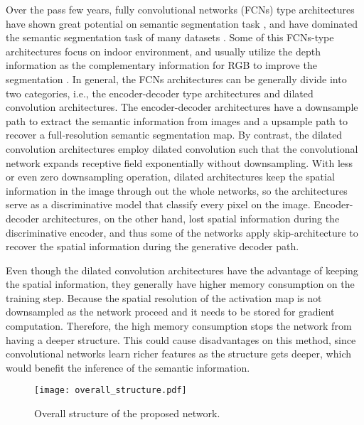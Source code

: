 \documentclass[runningheads]{llncs}
\begin{document}
Over the pass few years, fully convolutional networks (FCNs) type architectures have shown great potential on semantic segmentation task \cite{long2015fully,noh2015learning,badrinarayanan2015segnet,chen2016deeplab,yu2015multi,lin2017refinenet,yu2017dilated}, and have dominated the semantic segmentation task of many datasets \cite{everingham2010pascal,cordts2016cityscapes,song2015sun}. Some of this FCNs-type architectures focus on indoor environment, and usually utilize the depth information as the complementary information for RGB to improve the segmentation \cite{long2015fully,couprie2013indoor,gupta2014learning,hazirbas2016fusenet}. In general, the FCNs architectures can be generally divide into two categories, i.e., the encoder-decoder type architectures and dilated convolution architectures. The encoder-decoder architectures \cite{long2015fully,noh2015learning,badrinarayanan2015segnet,lin2017refinenet,hazirbas2016fusenet} have a downsample path to extract the semantic information from images and a upsample path to recover a full-resolution semantic segmentation map. By contrast, the dilated convolution architectures \cite{chen2016deeplab,yu2015multi,yu2017dilated} employ dilated convolution such that the convolutional network expands receptive field exponentially without downsampling. With less or even zero downsampling operation, dilated architectures keep the spatial information in the image through out the whole networks, so the architectures serve as a discriminative model that classify every pixel on the image. Encoder-decoder architectures, on the other hand, lost spatial information during the discriminative encoder, and thus some of the networks apply skip-architecture to recover the spatial information during the generative decoder path.

Even though the dilated convolution architectures have the advantage of keeping the spatial information, they generally have higher memory consumption on the training step. Because the spatial resolution of the activation map is not downsampled as the network proceed and it needs to be stored for gradient computation. Therefore, the high memory consumption stops the network from having a deeper structure. This could cause disadvantages on this method, since convolutional networks learn richer features as the structure gets deeper, which would benefit the inference of the semantic information. 

\begin{figure}[!t]
    \centering
    \texttt{[image: overall\_structure.pdf]}
    \caption{Overall structure of the proposed network.}
    \label{fig:Overall}
\end{figure}
\end{document}
